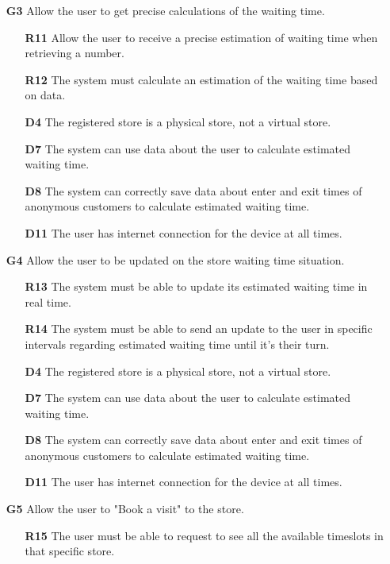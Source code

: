 \begin{enumerate}
\begin{enumerate}
	\end{enumerate}
	\item [\textbf{G3}] Allow the user to get precise calculations of the waiting time.
	\begin{enumerate}
		\item [\textbf{R11}] Allow the user to receive a precise estimation of waiting time when retrieving a number.
		\item [\textbf{R12}] The system must calculate an estimation of the waiting time based on data.
		\item [\textbf{D4}] The registered store is a physical store, not a virtual store.
		\item [\textbf{D7}] The system can use data about the user to calculate estimated waiting time.
		\item [\textbf{D8}] The system can correctly save data about enter and exit times of anonymous customers to calculate estimated waiting time.
		\item [\textbf{D11}] The user has internet connection for the device at all times.
	\end{enumerate}
	\item [\textbf{G4}] Allow the user to be updated on the store waiting time situation.
	\begin{enumerate}
		\item [\textbf{R13}] The system must be able to update its estimated waiting time in real time.
		\item [\textbf{R14}] The system must be able to send an update to the user in specific intervals regarding estimated waiting time until it's their turn.
		\item [\textbf{D4}] The registered store is a physical store, not a virtual store.
		\item [\textbf{D7}] The system can use data about the user to calculate estimated waiting time.
		\item [\textbf{D8}] The system can correctly save data about enter and exit times of anonymous customers to calculate estimated waiting time.
		\item [\textbf{D11}] The user has internet connection for the device at all times.
	\end{enumerate}
	\item [\textbf{G5}] Allow the user to "Book a visit" to the store.
	\begin{enumerate}
			\item [\textbf{R15}] The user must be able to request to see all the available timeslots in that specific store.

\end{enumerate}
\end{enumerate}

